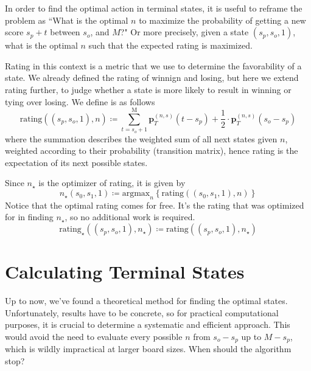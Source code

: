 \documentclass[a4paper]{article}
\begin{document}
In order to find the optimal action in terminal states, it is useful to reframe the problem as ``What is the optimal $n$ to maximize the probability of getting a new score $s_p + t$ between $s_o$, and $M$?" Or more precisely, given a state $(s_p, s_o, 1)$, what is the optimal $n$ such that the expected rating is maximized.

Rating in this context is a metric that we use to determine the favorability of a state. We already defined the rating of winnign and losing, but here we extend rating further, to judge whether a state is more likely to result in winning or tying over losing. We define is as follows
%
\begin{equation}
    \text{rating}((s_p, s_o, 1), n) \coloneqq \sum_{t = s_o+1}^{\text{M}} \textbf{p}_{T}^{(n, s)}(t - s_p) + \frac{1}{2} \cdot \textbf{p}_{T}^{(n, s)}(s_o - s_p)
\end{equation}
%
where the summation describes the weighted sum of all next states given $n$, weighted according to their probability (transition matrix), hence rating is the expectation of its next possible states. 

Since $n_{\star}$ is the optimizer of rating, it is given by
%
\begin{equation}
    n_{\star}(s_0, s_1, 1) \coloneqq \text{argmax}_n \left\{ \text{rating}((s_0, s_1, 1), n) \right\}
\end{equation}
%
Notice that the optimal rating comes for free. It's the rating that was optimized for in finding $n_{\star}$, so no additional work is required.
%
\begin{equation}
    \text{rating}_{\star}((s_p, s_o, 1), n_{\star}) \coloneqq \text{rating}((s_p, s_o, 1), n_{\star})
\end{equation}


\section{Calculating Terminal States}

Up to now, we've found a theoretical method for finding the optimal states. Unfortunately, results have to be concrete, so for practical computational purposes, it is crucial to determine a systematic and efficient approach. This would avoid the need to evaluate every possible $n$ from $s_o - s_p$ up to $M - s_p$, which is wildly impractical at larger board sizes. When should the algorithm stop?
\end{document}
